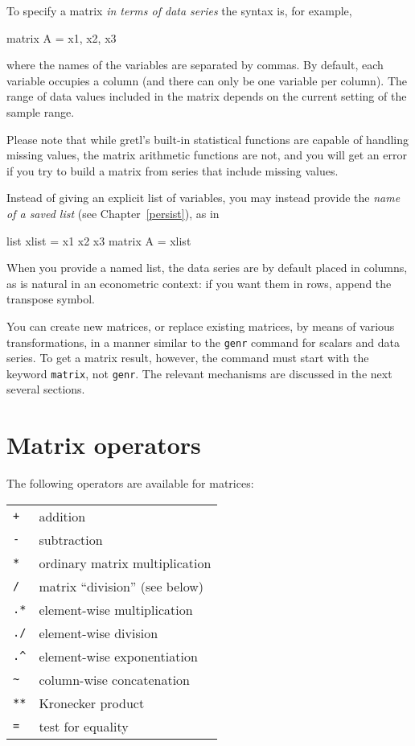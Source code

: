 To specify a matrix \textit{in terms of data series} the syntax is,
for example,
%
\begin{code}
matrix A = { x1, x2, x3 }
\end{code}
%
where the names of the variables are separated by commas.  By default,
each variable occupies a column (and there can only be one variable
per column).  The range of data values included in the matrix depends
on the current setting of the sample range.

Please note that while gretl's built-in statistical functions are
capable of handling missing values, the matrix arithmetic functions
are not, and you will get an error if you try to build a matrix from
series that include missing values.

Instead of giving an explicit list of variables, you may instead
provide the \textit{name of a saved list} (see Chapter~\ref{persist}),
as in
%
\begin{code}
list xlist = x1 x2 x3
matrix A = { xlist }
\end{code}
%
When you provide a named list, the data series are by default placed
in columns, as is natural in an econometric context: if you want them
in rows, append the transpose symbol.

You can create new matrices, or replace existing matrices, by means of
various transformations, in a manner similar to the \texttt{genr}
command for scalars and data series.  To get a matrix result, however,
the command must start with the keyword \texttt{matrix}, not
\texttt{genr}.  The relevant mechanisms are discussed in the next
several sections.

\section{Matrix operators}
\label{matrix-op}

The following operators are available for matrices:

\begin{center}
\begin{tabular}{ll}
\texttt{+} & addition \\
\texttt{-} & subtraction \\
\texttt{*} & ordinary matrix multiplication \\
\texttt{/} & matrix ``division'' (see below) \\
\texttt{.*} & element-wise multiplication \\
\texttt{./} & element-wise division \\
\verb+.^+ & element-wise exponentiation \\
\verb+~+ & column-wise concatenation \\
\texttt{**} & Kronecker product \\
\texttt{=} & test for equality 
\end{tabular}
\end{center}

